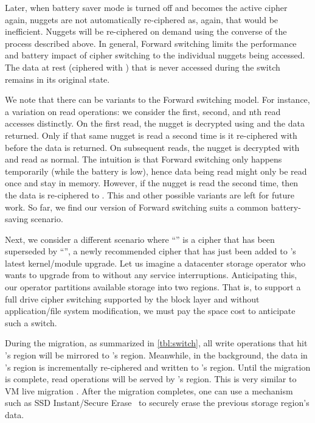 Later, when battery saver mode is turned off and \cone becomes the active cipher
again, nuggets are not automatically re-ciphered as, again, that would be
inefficient. Nuggets will be re-ciphered on demand using the converse of the
process described above. In general, Forward switching limits the performance
and battery impact of cipher switching to the individual nuggets being accessed.
The data at rest (ciphered with \cone) that is never accessed during the switch
remains in its original state.

We note that there can be variants to the Forward switching model. For instance,
a variation on read operations: we consider the first, second, and nth read
accesses distinctly. On the first read, the nugget is decrypted using \cone and
the data returned. Only if that same nugget is read a second time is it
re-ciphered with \ctwo before the data is returned. On subsequent reads, the
nugget is decrypted with \ctwo and read as normal. The intuition is that Forward
switching only happens temporarily (\eg while the battery is low), hence data
being read might only be read once and stay in memory. However, if the nugget is
read the second time, then the data is re-ciphered to \ctwo. This and other
possible variants are left for future work. So far, we find our version of
Forward switching suits a common battery-saving scenario.



 Next, we consider a different scenario where
``\cone'' is a cipher that has been superseded by ``\ctwo'', a newly recommended
cipher that has just been added to \sys's latest kernel/module upgrade. Let us
imagine a datacenter storage operator who wants to upgrade from \cone to \ctwo
without any service interruptions. Anticipating this, our operator partitions
available storage into two regions. That is, to support a full drive cipher
switching supported by the block layer and without application/file system
modification, we must pay the space cost to anticipate such a switch.

During the migration, as summarized in \cref{tbl:switch}, all write
operations that hit \cone's region will be mirrored to \ctwo's region.
Meanwhile, in the background, the data in \cone's region is incrementally
re-ciphered and written to \ctwo's region. Until the migration is complete, read
operations will be served by \cone's region. This is very similar to VM live
migration \cite{live-vm-migration}. After the migration completes, one can use a
mechanism such as SSD Instant/Secure Erase~\cite{ISE1,ISE2,ISE3} to securely
erase the previous storage region's data.

